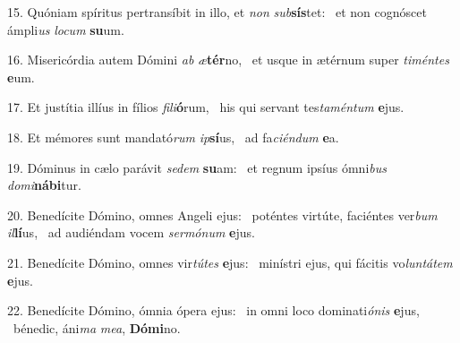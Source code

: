 15. Quóniam spíritus pertransíbit in illo, et \textit{non} \textit{sub}\textbf{sís}tet: \ast\  et non cognóscet ámpli\textit{us} \textit{lo}\textit{cum} \textbf{su}um.\

16. Misericórdia autem Dómini \textit{ab} \textit{æ}\textbf{tér}no, \ast\  et usque in ætérnum super \textit{ti}\textit{mén}\textit{tes} \textbf{e}um.\

17. Et justítia illíus in fílios \textit{fi}\textit{li}\textbf{ó}rum, \ast\  his qui servant tes\textit{ta}\textit{mén}\textit{tum} \textbf{e}jus.\

18. Et mémores sunt mandató\textit{rum} \textit{ip}\textbf{sí}us, \ast\  ad fa\textit{ci}\textit{én}\textit{dum} \textbf{e}a.\

19. Dóminus in cælo parávit \textit{se}\textit{dem} \textbf{su}am: \ast\  et regnum ipsíus ómni\textit{bus} \textit{do}\textit{mi}\textbf{ná}\textbf{bi}tur.\

20. Benedícite Dómino, omnes Angeli ejus: \dag\  poténtes virtúte, faciéntes ver\textit{bum} \textit{il}\textbf{lí}us, \ast\  ad audiéndam vocem \textit{ser}\textit{mó}\textit{num} \textbf{e}jus.\

21. Benedícite Dómino, omnes vir\textit{tú}\textit{tes} \textbf{e}jus: \ast\  minístri ejus, qui fácitis vo\textit{lun}\textit{tá}\textit{tem} \textbf{e}jus.\

22. Benedícite Dómino, ómnia ópera ejus: \dag\  in omni loco dominati\textit{ó}\textit{nis} \textbf{e}jus, \ast\  bénedic, áni\textit{ma} \textit{me}\textit{a}, \textbf{Dó}\textbf{mi}no.\

